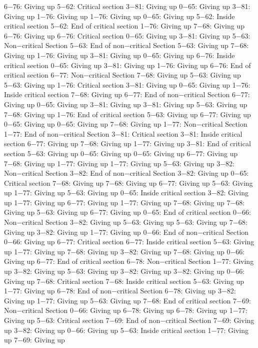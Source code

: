 6−76: Giving up
5−62: Critical section
3−81: Giving up
0−65: Giving up
3−81: Giving up
1−76: Giving up
1−76: Giving up
0−65: Giving up
5−62: Inside critical section
5−62: End of critical section
1−76: Giving up
7−68: Giving up
6−76: Giving up
6−76: Critical section
0−65: Giving up
3−81: Giving up
5−63: Non−critical Section
5−63: End of non−critical Section
5−63: Giving up
7−68: Giving up
1−76: Giving up
3−81: Giving up
0−65: Giving up
6−76: Inside critical section
0−65: Giving up
3−81: Giving up
1−76: Giving up
6−76: End of critical section
6−77: Non−critical Section
7−68: Giving up
5−63: Giving up
5−63: Giving up
1−76: Critical section
3−81: Giving up
0−65: Giving up
1−76: Inside critical section
7−68: Giving up
6−77: End of non−critical Section
6−77: Giving up
0−65: Giving up
3−81: Giving up
3−81: Giving up
5−63: Giving up
7−68: Giving up
1−76: End of critical section
5−63: Giving up
6−77: Giving up
0−65: Giving up
0−65: Giving up
7−68: Giving up
1−77: Non−critical Section
1−77: End of non−critical Section
3−81: Critical section
3−81: Inside critical section
6−77: Giving up
7−68: Giving up
1−77: Giving up
3−81: End of critical section
5−63: Giving up
0−65: Giving up
0−65: Giving up
6−77: Giving up
7−68: Giving up
1−77: Giving up
1−77: Giving up
5−63: Giving up
3−82: Non−critical Section
3−82: End of non−critical Section
3−82: Giving up
0−65: Critical section
7−68: Giving up
7−68: Giving up
6−77: Giving up
5−63: Giving up
1−77: Giving up
5−63: Giving up
0−65: Inside critical section
3−82: Giving up
1−77: Giving up
6−77: Giving up
1−77: Giving up
7−68: Giving up
7−68: Giving up
5−63: Giving up
6−77: Giving up
0−65: End of critical section
0−66: Non−critical Section
3−82: Giving up
5−63: Giving up
5−63: Giving up
7−68: Giving up
3−82: Giving up
1−77: Giving up
0−66: End of non−critical Section
0−66: Giving up
6−77: Critical section
6−77: Inside critical section
5−63: Giving up
1−77: Giving up
7−68: Giving up
3−82: Giving up
7−68: Giving up
0−66: Giving up
6−77: End of critical section
6−78: Non−critical Section
1−77: Giving up
3−82: Giving up
5−63: Giving up
3−82: Giving up
3−82: Giving up
0−66: Giving up
7−68: Critical section
7−68: Inside critical section
5−63: Giving up
1−77: Giving up
6−78: End of non−critical Section
6−78: Giving up
3−82: Giving up
1−77: Giving up
5−63: Giving up
7−68: End of critical section
7−69: Non−critical Section
0−66: Giving up
6−78: Giving up
6−78: Giving up
1−77: Giving up
5−63: Critical section
7−69: End of non−critical Section
7−69: Giving up
3−82: Giving up
0−66: Giving up
5−63: Inside critical section
1−77: Giving up
7−69: Giving up
